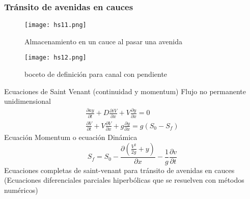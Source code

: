 \subsubsection{Tránsito de avenidas en cauces}
\begin{figure}[h!]
\centering
  \texttt{[image: hs11.png]}
  \caption{Almacenamiento en un cauce al pasar una avenida}
  \label{hs11}
\end{figure}


\begin{figure}[h!]
\centering
  \texttt{[image: hs12.png]}
  \caption{boceto de definición para canal con pendiente}
  \label{hs12}
\end{figure}
Ecuaciones de Saint Venant (continuidad y momentum) Flujo no permanente unidimensional
\begin{align}
    \frac{\partial ay}{\partial t} + D \frac{\partial iV}{\partial x} + V \frac{\partial y}{\partial x} = 0\\
    \frac{\partial V}{\partial t} + V \frac{\partial V}{\partial x} + g \frac{\partial y}{\partial x} = g\left(S_0 - S_f\right)
\end{align}
Ecuación Momentum o ecuación Dinámica
\begin{equation}
    S_f = S_0 -\frac{\partial\left(\frac{V^2}{2g} + y\right)}{\partial x} - \frac{1}{g}\frac{\partial v}{\partial t} 
\end{equation}
Ecuaciones completas de saint-venant para tránsito de avenidas en cauces (Ecuaciones diferenciales parciales hiperbólicas que se resuelven con métodos numéricos) 

